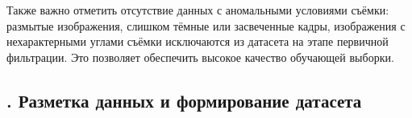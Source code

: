 {  \par \redline Также важно отметить отсутствие данных с аномальными условиями съёмки: размытые изображения, слишком тёмные или засвеченные кадры, изображения с нехарактерными углами съёмки исключаются из датасета на этапе первичной фильтрации. Это позволяет обеспечить высокое качество обучающей выборки.

  \par
}

\subtitlespace

\subsection*{
  \gostTitleFont
  \redline
  \thechaptercntr .\thesubchaptercntr \spc
  Разметка данных и формирование датасета
} \addtocounter{subchaptercntr}{1}

\subtitlespace

